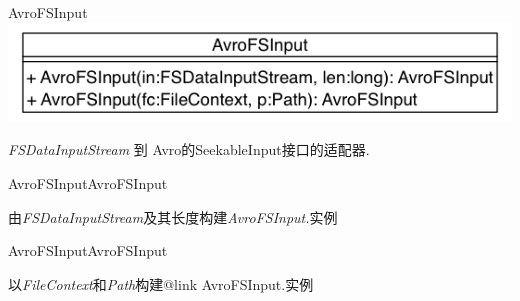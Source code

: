 \begin{XeClass}{AvroFSInput}
\includegraphics[width=\textwidth]{cdig/AvroFSInput.png}
     
 \emph{FSDataInputStream} 到 Avro的SeekableInput接口的适配器. 

    \begin{XeMethod}{\XePublic}{AvroFSInput}{AvroFSInput}
         
 由\emph{FSDataInputStream}及其长度构建\emph{AvroFSInput.}实例 

    \end{XeMethod}

    \begin{XeMethod}{\XePublic}{AvroFSInput}{AvroFSInput}
         
 以\emph{FileContext}和\emph{Path}构建{@link AvroFSInput.}实例 

    \end{XeMethod}

\end{XeClass}
